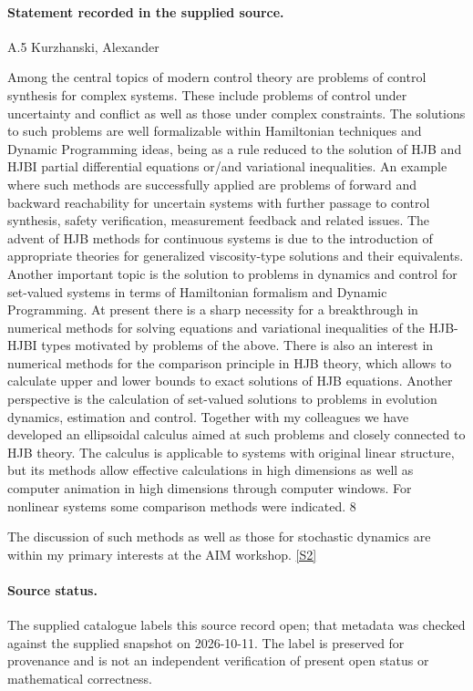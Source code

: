 \documentclass[11pt]{article}
\begin{document}
\paragraph{Statement recorded in the supplied source.}
A.5 Kurzhanski, Alexander

Among the central topics of modern control theory are problems of control synthesis for complex systems. These include problems of control under uncertainty and conflict as well as those under complex constraints. The solutions to such problems are well formalizable within Hamiltonian techniques and Dynamic Programming ideas, being as a rule reduced to the solution of HJB and HJBI partial differential equations or/and variational inequalities. An example where such methods are successfully applied are problems of forward and backward reachability for uncertain systems with further passage to control synthesis, safety verification, measurement feedback and related issues. The advent of HJB methods for continuous systems is due to the introduction of appropriate theories for generalized viscosity-type solutions and their equivalents. Another important topic is the solution to problems in dynamics and control for set-valued systems in terms of Hamiltonian formalism and Dynamic Programming. At present there is a sharp necessity for a breakthrough in numerical methods for solving equations and variational inequalities of the HJB-HJBI types motivated by problems of the above. There is also an interest in numerical methods for the comparison principle in HJB theory, which allows to calculate upper and lower bounds to exact solutions of HJB equations. Another perspective is the calculation of set-valued solutions to problems in evolution dynamics, estimation and control. Together with my colleagues we have developed an ellipsoidal calculus aimed at such problems and closely connected to HJB theory. The calculus is applicable to systems with original linear structure, but its methods allow effective calculations in high dimensions as well as computer animation in high dimensions through computer windows. For nonlinear systems some comparison methods were indicated. 8

The discussion of such methods as well as those for stochastic dynamics are within my primary interests at the AIM workshop. \href{https://aimath.org/WWN/optimalcontrol/optimalcontrol.pdf}{[S2]}
\paragraph{Source status.}
The supplied catalogue labels this source record open; that metadata was checked against the supplied snapshot on 2026-10-11. The label is preserved for provenance and is not an independent verification of present open status or mathematical correctness.
\end{document}

